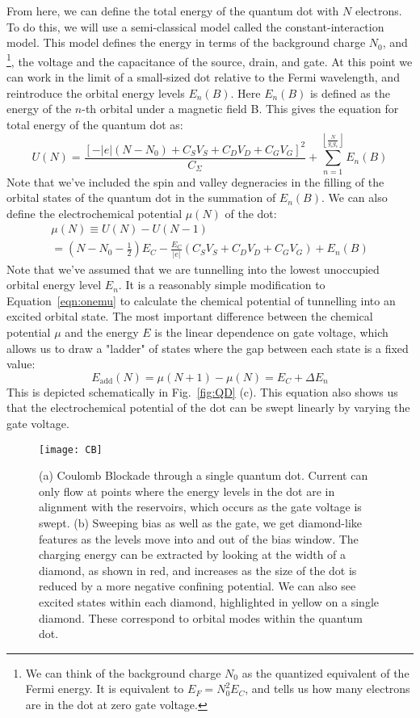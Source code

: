 From here, we can define the total energy of the quantum dot with $N$ electrons. To do this, we will use a
semi-classical model called the constant-interaction model. This model defines the energy in terms of the background charge $N_0$, and
\footnote{We can think of the background charge $N_0$ as the quantized equivalent of the Fermi energy. It is equivalent
to $E_F = N_0^2 E_C$, and tells us how many electrons are in the dot at zero gate voltage.},
the voltage and the capacitance of the source, drain, and gate. At this point we can work in the limit of
a small-sized dot relative to the Fermi wavelength, and reintroduce the orbital energy levels $E_n(B)$. Here $E_n(B)$
is defined as the energy of the $n$-th orbital under a magnetic field B. This gives the equation for total energy of the quantum
dot as:
\begin{equation}
  U(N) = \frac{[-|e|(N-N_0) + C_SV_S + C_DV_D + C_GV_G]^2}{C_\Sigma} + \sum_{n=1}^{\left\lfloor\frac{N}{g_sg_v}\right\rfloor} E_n(B)
\end{equation}
Note that we've included the spin and valley degneracies in the filling of the orbital states of the quantum dot in
the summation of $E_n(B)$. We can also define the electrochemical potential $\mu(N)$ of the dot:
\begin{multline}
  \mu(N) \equiv U(N) - U(N-1) \\
    = \left(N - N_0 - \tfrac{1}{2}\right)E_C - \frac{E_C}{|e|}\left(C_SV_S + C_DV_D + C_GV_G\right) + E_{n}(B)
  \label{eqn:onemu}
\end{multline}
Note that we've assumed that we are tunnelling into the lowest unoccupied orbital energy level $E_n$. It is a reasonably
simple modification to Equation~\ref{eqn:onemu} to calculate the chemical potential of tunnelling into an excited orbital
state. The most important difference between the chemical potential $\mu$ and the energy $E$ is the linear dependence on gate voltage,
which allows us to draw a "ladder" of states where the gap between each state is a fixed value:
\begin{equation}
  E_{\textrm{add}}(N) = \mu(N+1) - \mu(N) = E_C + \Delta E_n
\end{equation}
This is depicted schematically in Fig.~\ref{fig:QD} (c). This equation also shows us that the electrochemical
potential of the dot can be swept linearly by varying the gate voltage.

\begin{figure}
  \texttt{[image: CB]}
  \caption[Coulomb Blockade in a single quantum dot]
  {\label{fig:cbtrans}(a) Coulomb Blockade through a single quantum dot. Current can only flow at points
  where the energy levels in the dot are in alignment with the reservoirs, which occurs as the gate voltage
  is swept. (b) Sweeping bias as well as the gate, we get diamond-like features as the levels move into
  and out of the bias window. The charging energy can be extracted by looking at the width of a diamond, as
  shown in red, and increases as the size of the dot is reduced by a more negative confining potential. We can
  also see excited states within each diamond, highlighted in yellow on a single diamond. These correspond to orbital
  modes within the quantum dot.
  }
\end{figure}

